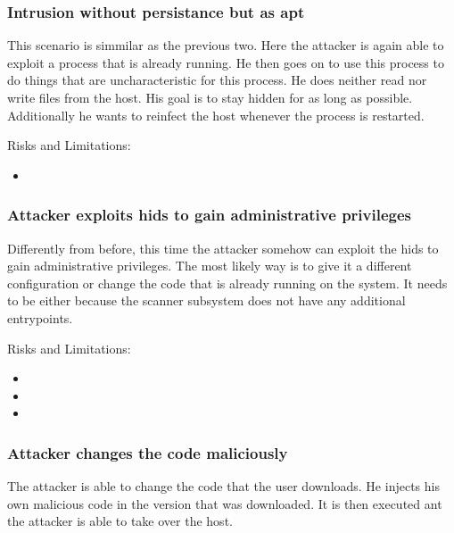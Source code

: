 \documentclass[
	a4paper,					%
	10pt,							%
	twoside,					%
	openright,				%
	notitlepage,			%
	parskip=half,			%
]{scrreprt}					%
\begin{document}
\subsubsection{Intrusion without persistance but as apt}
\label{sec:attack:nopersistanceapt}

This scenario is simmilar as the previous two. Here the attacker is again able to exploit a process that is already running. He then goes on to use this process to do things that are uncharacteristic for this process. He does neither read nor write files from the host. His goal is to stay hidden for as long as possible. Additionally he wants to reinfect the host whenever the process is restarted.

Risks and Limitations:
\begin{itemize}
	\item {}
\end{itemize}

\subsubsection{Attacker exploits \gls{hids} to gain administrative privileges}
\label{sec:attack:exploitforroot}

Differently from before, this time the attacker somehow can exploit the \gls{hids} to gain administrative privileges. The most likely way is to give it a different configuration or change the code that is already running on the system. It needs to be either because the scanner subsystem does not have any additional entrypoints.

Risks and Limitations:
\begin{itemize}
	\item {}
	\item {}
	\item {}
\end{itemize}

\subsubsection{Attacker changes the code maliciously}
\label{sec:attack:codechange}

The attacker is able to change the code that the user downloads. He injects his own malicious code in the version that was downloaded. It is then executed ant the attacker is able to take over the host.
\end{document}
